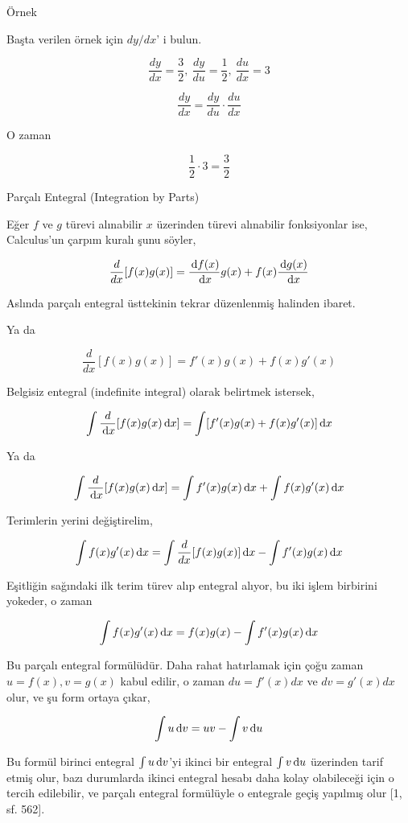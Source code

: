 \documentclass[12pt,fleqn]{article}\usepackage{../../common}
\begin{document}
Örnek 

Başta verilen örnek için $dy/dx$' i bulun. 

$$ \frac{ dy}{dx} = \frac{ 3}{2}, \
\frac{dy}{du} = \frac{ 1}{2}, \
\frac{ du}{dx} = 3
 $$

$$ \frac{ dy}{dx} = \frac{ dy}{du} \cdot \frac{ du}{dx} $$

O zaman 

$$ \frac{ 1}{2} \cdot 3 = \frac{ 3}{2} $$

\newpage

Parçalı Entegral (Integration by Parts)

Eğer $f$ ve $g$ türevi alınabilir $x$ üzerinden türevi alınabilir
fonksiyonlar ise, Calculus'un çarpım kuralı şunu söyler, 

$$ 
\frac{d}{dx} [ f(x)g(x) ] = 
\frac{\,\mathrm{d} f(x)}{\,\mathrm{d} x}g(x) + f(x) \frac{\,\mathrm{d}  g(x)}{\,\mathrm{d} x}
$$

Aslında parçalı entegral üsttekinin tekrar düzenlenmiş halinden ibaret. 

Ya da

$$ \frac{d}{dx} [ f(x)g(x) ] = f'(x)g(x) + f(x)g'(x)$$

Belgisiz entegral (indefinite integral) olarak belirtmek istersek, 

$$ \int \frac{d}{\,\mathrm{d} x}[ f(x)g(x) \,\mathrm{d} x ] = \int [f'(x)g(x) + f(x)g'(x)] \,\mathrm{d} x$$

Ya da

$$
\int \frac{d}{\,\mathrm{d} x}[ f(x)g(x) \,\mathrm{d} x ] = \int f'(x)g(x) \,\mathrm{d} x + \int f(x)g'(x)\,\mathrm{d} x
$$

Terimlerin yerini değiştirelim, 

$$
\int f(x)g'(x) \,\mathrm{d} x = \int \frac{d}{dx}[f(x)g(x)] \,\mathrm{d} x - \int f'(x)g(x) \,\mathrm{d} x
$$

Eşitliğin sağındaki ilk terim türev alıp entegral alıyor, bu iki işlem
birbirini yokeder, o zaman 

$$ \int f(x)g'(x) \,\mathrm{d} x = f(x)g(x) - \int f'(x)g(x) \,\mathrm{d} x$$

Bu parçalı entegral formülüdür. Daha rahat hatırlamak için çoğu zaman
$u=f(x),v=g(x)$ kabul edilir, o zaman $du = f'(x)dx$ ve $dv = g'(x)dx$
olur, ve şu form ortaya çıkar,

$$ \int u \,\mathrm{d} v = uv - \int v \,\mathrm{d} u$$

Bu formül birinci entegral $\int u \,\mathrm{d} v$'yi ikinci bir entegral $\int v \,\mathrm{d} u$
üzerinden tarif etmiş olur, bazı durumlarda ikinci entegral hesabı daha kolay
olabileceği için o tercih edilebilir, ve parçalı entegral formülüyle o entegrale
geçiş yapılmış olur [1, sf. 562].
\end{document}
